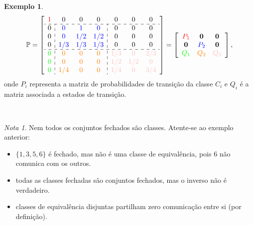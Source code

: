 \documentclass[
  11pt,
  a4paper,
]{book}
\theoremstyle{definition}
\theoremstyle{definition}
\newtheorem{example}{Exemplo}[chapter]
\theoremstyle{definition}
\theoremstyle{definition}
\theoremstyle{remark}
\newtheorem*{remark}{Nota }
\begin{document}
\begin{example}
\[
\mathbb{P} =
\left[
\begin{array}{c:ccc:ccc}
\color{red}{1} & 0 & 0 & 0 & 0 & 0 & 0  \\ \hdashline
0 & \color{blue}{0} & \color{blue}{1} & \color{blue}{0} & 0 & 0 & 0  \\
0 & \color{blue}{0} & \color{blue}{1/2} & \color{blue}{1/2} & 0 & 0 & 0 \\
0 & \color{blue}{1/3} & \color{blue}{1/3} & \color{blue}{1/3} & 0 & 0 & 0  \\ \hdashline
\color{green}{0} & \color{orange}{0} & \color{orange}{0} & \color{orange}{0} & \color{pink}{1/3} & \color{pink}{0} & \color{pink}{2/3}  \\
\color{green}{0} & \color{orange}{0} & \color{orange}{0} & \color{orange}{0} & \color{pink}{1/2} & \color{pink}{1/2} & \color{pink}{0}  \\
\color{green}{0} & \color{orange}{1/4} & \color{orange}{0} & \color{orange}{0} & \color{pink}{1/4} & \color{pink}{0} & \color{pink}{3/4}  
\end{array}
\right]
=
\left[
\begin{array}{ccc}
\color{red}{P_1} & \textbf{0} & \textbf{0} \\
\textbf{0} & \color{blue}{P_2} & \textbf{0} \\
\color{green}{Q_1} & \color{orange}{Q_2} & \color{pink}{Q_3}
\end{array}
\right],
\]
onde \(P_i\) representa a matriz de probabilidades de transição da classe \(C_i\) e \(Q_i\) é a matriz associada a estados de transição.
\end{example}

\(\,\)

\begin{remark}

Nem todos os conjuntos fechados são classes. Atente-se ao exemplo anterior:

\begin{itemize}
\item
  \(\{1,3,5,6\}\) é fechado, mas não é uma classe de equivalência, pois 6 não comunica com os outros.
\item
  todas as classes fechadas são conjuntos fechados, mas o inverso não é verdadeiro.
\item
  classes de equivalência disjuntas partilham zero comunicação entre si (por definição).
\end{itemize}

\end{remark}
\end{document}
